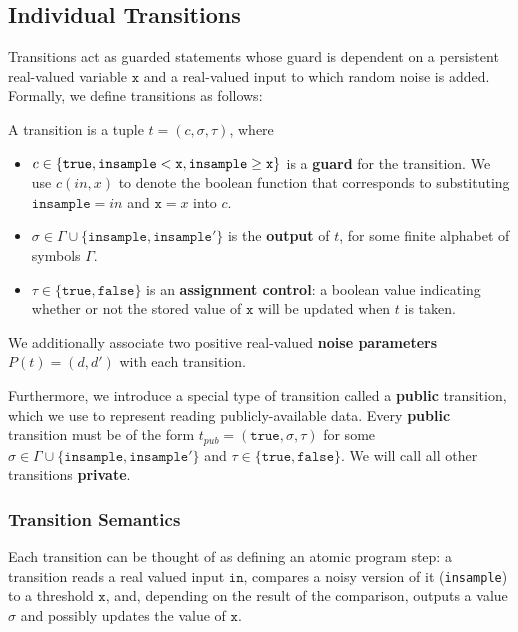 
\subsection{Individual Transitions}\label{svTransitionsSec}

Transitions act as guarded statements whose guard is dependent on a persistent real-valued variable $\texttt{x}$ and a real-valued input to which random noise is added. Formally, we define transitions as follows: 

\begin{defn}[Transitions]\label{svTransDef}
    A transition is a tuple $t = (c, \sigma, \tau)$, where \begin{itemize}
        \item $c\in \{\texttt{true}, \lguard[\texttt{x}], \gguard[\texttt{x}]\}$ is a \textbf{guard} for the transition. We use $c(in, x)$ to denote the boolean function that corresponds to substituting $\texttt{insample} = in$ and $\texttt{x} =x $ into $c$.
        \item $\sigma \in \Gamma\cup\{\texttt{insample}, \texttt{insample}'\}$ is the \textbf{output} of $t$, for some finite alphabet of symbols $\Gamma$.
        \item $\tau\in\{\texttt{true}, \texttt{false}\}$ is an \textbf{assignment control}: a boolean value indicating whether or not the stored value of $\texttt{x}$ will be updated when $t$ is taken.
    \end{itemize}
\end{defn}

We additionally associate two positive real-valued \textbf{noise parameters} $P(t) = (d, d')$ with each transition. 

Furthermore, we introduce a special type of transition called a \textbf{public} transition, which we use to represent reading publicly-available data. Every \textbf{public} transition must be of the form $t_{pub}= (\texttt{true}, \sigma, \tau)$ for some $\sigma \in \Gamma\cup\{\texttt{insample}, \texttt{insample}'\}$ and $\tau \in \{\texttt{true}, \texttt{false}\}$. We will call all other transitions \textbf{private}. 

\subsubsection{Transition Semantics}

Each transition can be thought of as defining an atomic program step: a transition reads a real valued input $\texttt{in}$, compares a noisy version of it (\texttt{insample}) to a threshold $\texttt{x}$, and, depending on the result of the comparison, outputs a value $\sigma$ and possibly updates the value of $\texttt{x}$.

